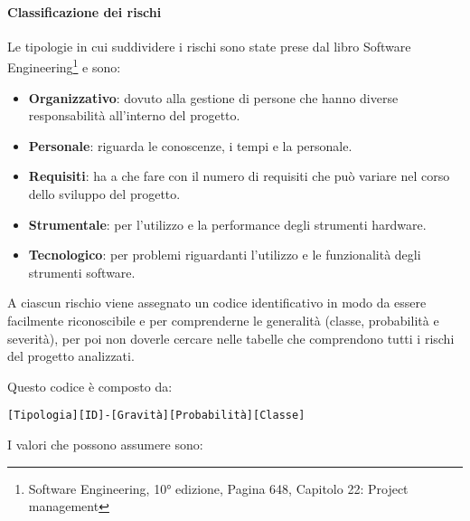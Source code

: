 			\paragraph{Classificazione dei rischi}
			Le tipologie in cui suddividere i rischi sono state prese dal libro Software Engineering\footnote{Software Engineering, 10° edizione, Pagina 648, Capitolo 22: Project management} e sono:
			\begin{itemize}
				\item \textbf{Organizzativo}: dovuto alla gestione di persone che hanno diverse responsabilità all'interno del progetto.
				\item \textbf{Personale}: riguarda le conoscenze, i tempi e la  personale.
				\item \textbf{Requisiti}: ha a che fare con il numero di requisiti che può variare nel corso dello sviluppo del progetto. %
				\item \textbf{Strumentale}: per l'utilizzo e la performance degli strumenti hardware.
				\item \textbf{Tecnologico}: per problemi riguardanti l'utilizzo e le funzionalità degli strumenti software.
			\end{itemize}

			A ciascun rischio viene assegnato un codice identificativo in modo da essere facilmente riconoscibile e per comprenderne le generalità (classe, probabilità e severità), per poi non doverle cercare nelle tabelle che comprendono tutti i rischi del progetto analizzati.

			Questo codice è composto da:

			\begin{center}
				\texttt{[Tipologia][ID]-[Gravità][Probabilità][Classe]}
			\end{center}
			\clearpage
			I valori che possono assumere sono:

